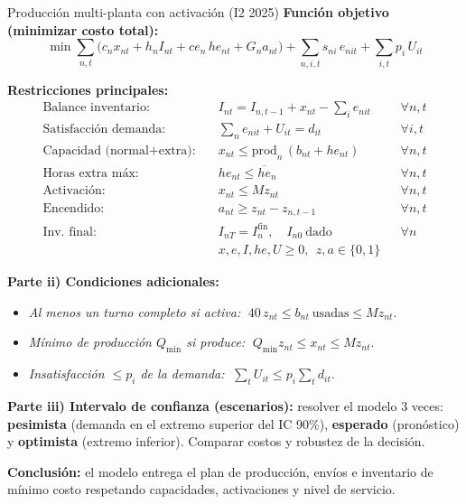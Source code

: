 \begin{ejercicio}{Producción multi-planta con activación (I2 2025)}
\textbf{Función objetivo (minimizar costo total):}
{\small
\[
\min \sum_{n,t}\!\Big( c_n x_{nt} + h_n I_{nt} + ce_n\,he_{nt} + G_n a_{nt}\Big)
   + \sum_{n,i,t} s_{ni}\,e_{nit}
   + \sum_{i,t} p_i\,U_{it}
\]}

\textbf{Restricciones principales:}
{\small
\begin{align*}
  \text{Balance inventario:}\quad & I_{nt} = I_{n,t-1} + x_{nt} - \textstyle\sum_i e_{nit} && \forall n,t\\
  \text{Satisfacción demanda:}\quad & \textstyle\sum_n e_{nit} + U_{it} = d_{it} && \forall i,t\\
  \text{Capacidad (normal+extra):}\quad & x_{nt} \le \text{prod}_n\,(b_{nt} + he_{nt}) && \forall n,t\\
  \text{Horas extra máx:}\quad & he_{nt} \le \overline{he}_n && \forall n,t\\
  \text{Activación:}\quad & x_{nt} \le M z_{nt} && \forall n,t\\
  \text{Encendido:}\quad & a_{nt} \ge z_{nt} - z_{n,t-1} && \forall n,t\\
  \text{Inv.\ final:}\quad & I_{nT} = I_n^{\text{fin}},\quad I_{n0}\ \text{dado} && \forall n\\
  & x,e,I,he,U \ge 0,\ \ z,a\in\{0,1\}
\end{align*}}

\textbf{Parte ii) Condiciones adicionales:}
\begin{itemize}[leftmargin=1.4em, itemsep=0pt]
  \item \textit{Al menos un turno completo si activa:} $\;40\,z_{nt} \le b_{nt}\ \text{usadas} \le M z_{nt}$.
  \item \textit{Mínimo de producción $Q_{\min}$ si produce:} $\;Q_{\min} z_{nt} \le x_{nt} \le M z_{nt}$.
  \item \textit{Insatisfacción $\le p_i$ de la demanda:} $\;\sum_t U_{it} \le p_i \sum_t d_{it}$.
\end{itemize}

\textbf{Parte iii) Intervalo de confianza (escenarios):} resolver el modelo 3 veces: \textbf{pesimista} (demanda en el extremo superior del IC 90\%), \textbf{esperado} (pronóstico) y \textbf{optimista} (extremo inferior). Comparar costos y robustez de la decisión.

\textbf{Conclusión:} el modelo entrega el plan de producción, envíos e inventario de mínimo costo respetando capacidades, activaciones y nivel de servicio.
\end{ejercicio}


